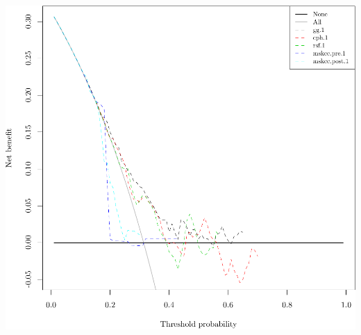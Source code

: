 \documentclass{article}\usepackage[]{graphicx}\usepackage[]{color}
\makeatletter
\def\maxwidth{ %
  \ifdim\Gin@nat@width>\linewidth
    \linewidth
  \else
    \Gin@nat@width
  \fi
}
\newenvironment{knitrout}{}{} %
\makeatother
\begin{document}
\begin{knitrout}
{\centering \includegraphics[width=\maxwidth]{figure/05-model-selection-dca-1} 

}



\end{knitrout}
\end{document}
